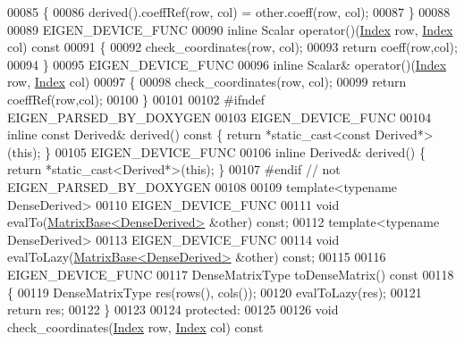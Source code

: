 \begin{DoxyCode}
00085     \{
00086       derived().coeffRef(row, col) = other.coeff(row, col);
00087     \}
00088 
00089     EIGEN\_DEVICE\_FUNC
00090     \textcolor{keyword}{inline} Scalar operator()(\hyperlink{group___core___module_a554f30542cc2316add4b1ea0a492ff02}{Index} row, \hyperlink{group___core___module_a554f30542cc2316add4b1ea0a492ff02}{Index} col)\textcolor{keyword}{ const}
00091 \textcolor{keyword}{    }\{
00092       check\_coordinates(row, col);
00093       \textcolor{keywordflow}{return} coeff(row,col);
00094     \}
00095     EIGEN\_DEVICE\_FUNC
00096     \textcolor{keyword}{inline} Scalar& operator()(\hyperlink{group___core___module_a554f30542cc2316add4b1ea0a492ff02}{Index} row, \hyperlink{group___core___module_a554f30542cc2316add4b1ea0a492ff02}{Index} col)
00097     \{
00098       check\_coordinates(row, col);
00099       \textcolor{keywordflow}{return} coeffRef(row,col);
00100     \}
00101 
00102 \textcolor{preprocessor}{    #ifndef EIGEN\_PARSED\_BY\_DOXYGEN}
00103     EIGEN\_DEVICE\_FUNC
00104     \textcolor{keyword}{inline} \textcolor{keyword}{const} Derived& derived()\textcolor{keyword}{ const }\{ \textcolor{keywordflow}{return} *\textcolor{keyword}{static\_cast<}\textcolor{keyword}{const }Derived*\textcolor{keyword}{>}(\textcolor{keyword}{this}); \}
00105     EIGEN\_DEVICE\_FUNC
00106     \textcolor{keyword}{inline} Derived& derived() \{ \textcolor{keywordflow}{return} *\textcolor{keyword}{static\_cast<}Derived*\textcolor{keyword}{>}(\textcolor{keyword}{this}); \}
00107 \textcolor{preprocessor}{    #endif // not EIGEN\_PARSED\_BY\_DOXYGEN}
00108 
00109     \textcolor{keyword}{template}<\textcolor{keyword}{typename} DenseDerived>
00110     EIGEN\_DEVICE\_FUNC
00111     \textcolor{keywordtype}{void} evalTo(\hyperlink{group___core___module_class_eigen_1_1_matrix_base}{MatrixBase<DenseDerived>} &other) \textcolor{keyword}{const};
00112     \textcolor{keyword}{template}<\textcolor{keyword}{typename} DenseDerived>
00113     EIGEN\_DEVICE\_FUNC
00114     \textcolor{keywordtype}{void} evalToLazy(\hyperlink{group___core___module_class_eigen_1_1_matrix_base}{MatrixBase<DenseDerived>} &other) \textcolor{keyword}{const};
00115 
00116     EIGEN\_DEVICE\_FUNC
00117     DenseMatrixType toDenseMatrix()\textcolor{keyword}{ const}
00118 \textcolor{keyword}{    }\{
00119       DenseMatrixType res(rows(), cols());
00120       evalToLazy(res);
00121       \textcolor{keywordflow}{return} res;
00122     \}
00123 
00124   \textcolor{keyword}{protected}:
00125 
00126     \textcolor{keywordtype}{void} check\_coordinates(\hyperlink{group___core___module_a554f30542cc2316add4b1ea0a492ff02}{Index} row, \hyperlink{group___core___module_a554f30542cc2316add4b1ea0a492ff02}{Index} col)\textcolor{keyword}{ const}

\end{DoxyCode}
